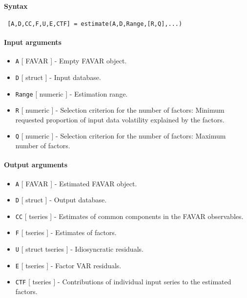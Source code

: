 


	\paragraph{Syntax}
 
 \begin{verbatim}
 [A,D,CC,F,U,E,CTF] = estimate(A,D,Range,[R,Q],...)
 \end{verbatim}
 
 \paragraph{Input arguments}
 
 \begin{itemize}
 \item
   \texttt{A} {[} FAVAR {]} - Empty FAVAR object.
 \item
   \texttt{D} {[} struct {]} - Input database.
 \item
   \texttt{Range} {[} numeric {]} - Estimation range.
 \item
   \texttt{R} {[} numeric {]} - Selection criterion for the number of
   factors: Minimum requested proportion of input data volatility
   explained by the factors.
 \item
   \texttt{Q} {[} numeric {]} - Selection criterion for the number of
   factors: Maximum number of factors.
 \end{itemize}
 
 \paragraph{Output arguments}
 
 \begin{itemize}
 \item
   \texttt{A} {[} FAVAR {]} - Estimated FAVAR object.
 \item
   \texttt{D} {[} struct {]} - Output database.
 \item
   \texttt{CC} {[} tseries {]} - Estimates of common components in the
   FAVAR observables.
 \item
   \texttt{F} {[} tseries {]} - Estimates of factors.
 \item
   \texttt{U} {[} struct \textbar{} tseries {]} - Idiosyncratic
   residuals.
 \item
   \texttt{E} {[} tseries {]} - Factor VAR residuals.
 \item
   \texttt{CTF} {[} tseries {]} - Contributions of individual input
   series to the estimated factors.
 \end{itemize}
 

